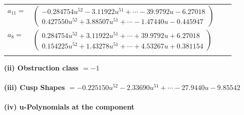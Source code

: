 \documentclass[1p]{elsarticle_modified}
\theoremstyle{definition}
\begin{document}
\begin{tabular}{m{7pt} m{180pt} m{7pt} m{180pt} }
\flushright $a_{11}=$&$\begin{pmatrix}-0.284754 u^{52}-3.11922 u^{51}+\cdots-39.9792 u-6.27018\\0.427550 u^{52}+3.88507 u^{51}+\cdots-1.47440 u-0.445947\end{pmatrix}$ \\
\flushright $a_{8}=$&$\begin{pmatrix}0.284754 u^{52}+3.11922 u^{51}+\cdots+39.9792 u+6.27018\\0.154225 u^{52}+1.43278 u^{51}+\cdots+4.53267 u+0.381154\end{pmatrix}$\\&\end{tabular}
\flushleft \textbf{(ii) Obstruction class $= -1$}\\~\\
\flushleft \textbf{(iii) Cusp Shapes $= -0.225150 u^{52}-2.33690 u^{51}+\cdots-27.9440 u-9.85542$}\\~\\
\newpage\renewcommand{\arraystretch}{1}
\flushleft \textbf{(iv) u-Polynomials at the component}\newline \\
\end{document}
